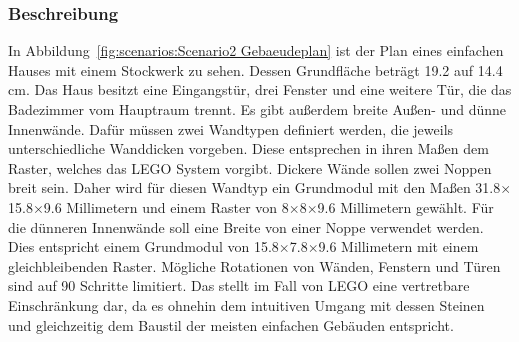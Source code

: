 \subsubsection*{Beschreibung}
In Abbildung~\ref{fig:scenarios:Scenario2 Gebaeudeplan} ist der Plan eines einfachen Hauses mit einem Stockwerk zu sehen.
Dessen Grundfläche beträgt 19.2 auf 14.4 cm.
Das Haus besitzt eine Eingangstür, drei Fenster und eine weitere Tür, die das Badezimmer vom Hauptraum trennt.
Es gibt außerdem breite Außen- und dünne Innenwände.
Dafür müssen zwei Wandtypen definiert werden, die jeweils unterschiedliche Wanddicken vorgeben.
Diese entsprechen in ihren Maßen dem Raster, welches das LEGO System vorgibt.
Dickere Wände sollen zwei Noppen breit sein.
Daher wird für diesen Wandtyp ein Grundmodul mit den Maßen 31.8$\times$15.8$\times$9.6 Millimetern und einem Raster von 8$\times$8$\times$9.6 Millimetern gewählt.
Für die dünneren Innenwände soll eine Breite von einer Noppe verwendet werden.
Dies entspricht einem Grundmodul von 15.8$\times$7.8$\times$9.6 Millimetern mit einem gleichbleibenden Raster.
Mögliche Rotationen von Wänden, Fenstern und Türen sind auf 90\textdegree{} Schritte limitiert.
Das stellt im Fall von LEGO eine vertretbare Einschränkung dar, da es ohnehin dem intuitiven Umgang mit dessen Steinen und gleichzeitig dem Baustil der meisten einfachen Gebäuden entspricht.

